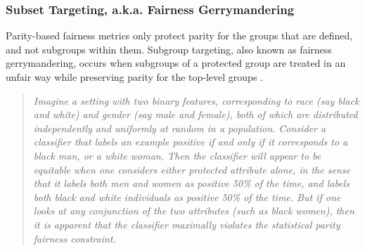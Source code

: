 \documentclass[11pt,dvipdfm]{article}
\begin{document}
\subsubsection{Subset Targeting, a.k.a. Fairness Gerrymandering}
Parity-based fairness metrics only protect parity for the groups that are defined, and not subgroups within them.  Subgroup targeting, also known as fairness gerrymandering, occurs when subgroups of a protected group are treated in an unfair way while preserving parity for the top-level groups \cite{dwork2012fairness,kearns2018preventing}. 
\begin{quote}
    \emph{Imagine a setting with two binary features,
corresponding to race (say black and white) and gender (say male and female), both of which are distributed independently and uniformly at random in a population. Consider a classifier that labels an example positive if and only if it corresponds to a black man, or a white woman. Then the classifier will appear to be equitable when one considers either protected attribute alone, in the sense that it labels
both men and women as positive 50\% of the time, and labels both black and white individuals as positive 50\% of the time. But if one looks at any conjunction of the two attributes (such as black women), then it is apparent that the classifier maximally violates the statistical parity fairness constraint.}  \cite{kearns2018preventing} 
\end{quote}







\end{document}
